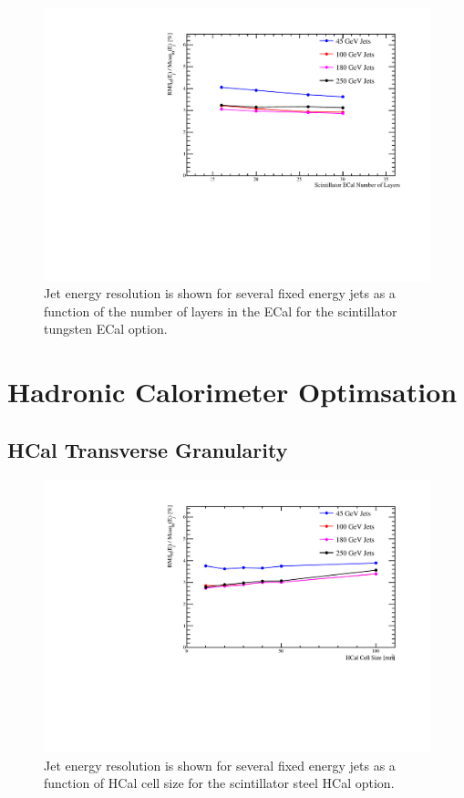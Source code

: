 \begin{figure}
  \includegraphics[width=\largefigwidth]{OptimisationStudies/Plots/JER_vs_ScintillatorECalNumberofLayers.pdf}
  \caption[Jet energy resolution as a function of the number of layers in the ECal for the scintillator tungsten ECal option.]{Jet energy resolution is shown for several fixed energy jets as a function of the number of layers in the ECal for the scintillator tungsten ECal option.}
  \label{optstud:fig:scecallayers}
\end{figure}

\section{Hadronic Calorimeter Optimsation}
\label{optstud:sec:hcal}

\subsection{HCal Transverse Granularity}
\label{optstud:sec:hcal:cellsize}

\begin{figure}
  \includegraphics[width=\largefigwidth]{OptimisationStudies/Plots/JER_vs_HCalCellSize.pdf}
  \caption[Jet energy resolution as a function of HCal cell size for the scintillator steel HCal option.]{Jet energy resolution is shown for several fixed energy jets as a function of HCal cell size for the scintillator steel HCal option.}
  \label{optstud:fig:hcalcells}
\end{figure}

